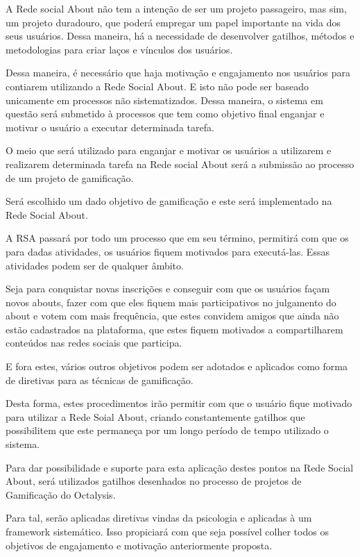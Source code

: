 A Rede social About não tem a intenção de ser um projeto passageiro, mas sim,
um projeto duradouro, que poderá empregar um papel importante na vida dos
seus usuários. Dessa maneira, há a necessidade de desenvolver gatilhos, métodos
e metodologias para criar laços e vínculos dos usuários.

Dessa maneira, é necessário que haja motivação e engajamento nos usuários para contiarem utilizando a Rede Social About. E isto não pode ser baseado unicamente
em processos não sistematizados. Dessa maneira, o sistema em questão será
submetido à processos que tem como objetivo final enganjar e motivar o usuário
a executar determinada tarefa.

O meio que será utilizado para enganjar e motivar os usuários a utilizarem e
realizarem determinada tarefa na Rede social About será a submissão ao processo
de um projeto de gamificação. 

Será escolhido um dado objetivo de gamificação e este será implementado na Rede
Social About.

A RSA passará por todo um processo que em seu término, permitirá com que os
para dadas atividades, os usuários fiquem motivados para executá-las. Essas
atividades podem ser de qualquer âmbito. 

Seja para conquistar novas inscrições e
conseguir com que os usuários façam novos abouts, fazer com que eles fiquem mais
participativos no julgamento do about e votem com mais frequência, que estes
convidem amigos que ainda não estão cadastrados na plataforma, que estes fiquem
motivados a compartilharem conteúdos nas redes sociais que participa.

E fora
estes, vários outros  objetivos podem ser adotados e aplicados como forma
de diretivas para as técnicas de gamificação.

Desta forma, estes procedimentos irão permitir com que o usuário fique motivado
para utilizar a Rede Soial About, criando constantemente gatilhos que possibilitem
que este permaneça por um longo período de tempo utilizado o sistema.

Para dar possibilidade e suporte para esta aplicação destes pontos na Rede
Social About, será utilizados gatilhos desenhados no processo de projetos
de Gamificação do Octalysis.

Para tal, serão aplicadas diretivas vindas da psicologia e aplicadas à um
framework sistemático. Isso propiciará com que seja possível colher
todos os objetivos de engajamento e motivação anteriormente proposta.

